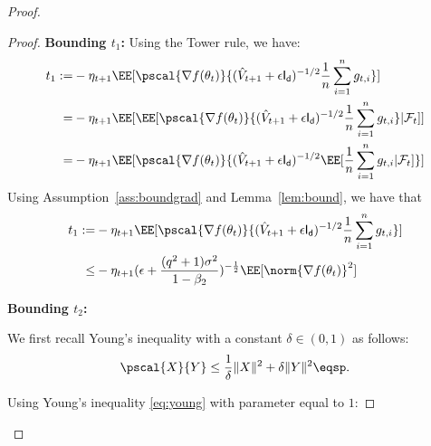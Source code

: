 \documentclass[11pt]{article}
\begin{document}
\begin{proof}
\begin{proof}
\textbf{Bounding $t_1$:}
Using the Tower rule, we have:
\begin{equation}
\begin{split}
t_1 := &  -\eta_{t+1}\EE[\pscal{\nabla f(\theta_t)}{(\hat{V}_{t+1} + \epsilon \mathsf{I_d})^{-1/2} \frac{1}{n}\sum_{i=1}^n  g_{t,i}} ] \\
=  & -\eta_{t+1}\EE[\EE[\pscal{\nabla f(\theta_t)}{(\hat{V}_{t+1} + \epsilon \mathsf{I_d})^{-1/2} \frac{1}{n}\sum_{i=1}^n  g_{t,i}} | \mathcal{F}_t]] \\
=  & -\eta_{t+1}\EE[\pscal{\nabla f(\theta_t)}{(\hat{V}_{t+1} + \epsilon \mathsf{I_d})^{-1/2}\EE[ \frac{1}{n}\sum_{i=1}^n  g_{t,i}| \mathcal{F}_t]} ] 
\end{split}
\end{equation}
Using Assumption~\ref{ass:boundgrad} and Lemma~\ref{lem:bound}, we have that 
\begin{equation}\label{eq:lem2eq1}
\begin{split}
t_1 := &  -\eta_{t+1}\EE[\pscal{\nabla f(\theta_t)}{(\hat{V}_{t+1} + \epsilon \mathsf{I_d})^{-1/2} \frac{1}{n}\sum_{i=1}^n  g_{t,i}} ] \\
\leq & - \eta_{t+1} (\epsilon + \frac{(q^2+1)\sigma^2}{1 - \beta_2})^{-\frac{1}{2}} \EE[\norm{\nabla f(\theta_t)}^2] 
 \end{split}
\end{equation}


\textbf{Bounding $t_2$:}

We first recall Young's inequality with a constant $\delta \in (0,1)$ as follows:
\begin{equation}\label{eq:young}
\pscal{X}{Y} \leq \frac{1}{\delta} \|X\|^2 + \delta \|Y\|^2 \eqsp.
\end{equation}

Using Young's inequality \eqref{eq:young} with parameter equal to $1$:


\end{proof}
\end{proof}
\end{document}
